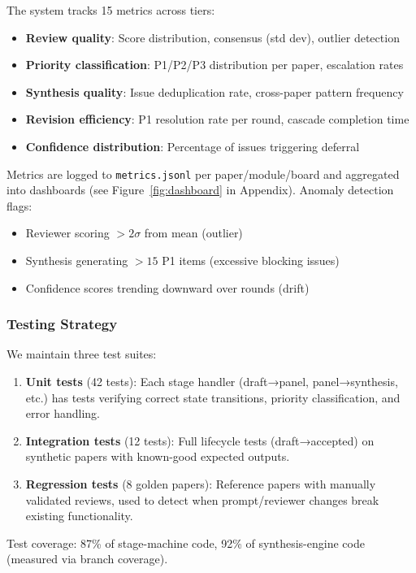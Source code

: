 The system tracks 15 metrics across tiers:
\begin{itemize}
\item \textbf{Review quality}: Score distribution, consensus (std dev), outlier detection
\item \textbf{Priority classification}: P1/P2/P3 distribution per paper, escalation rates
\item \textbf{Synthesis quality}: Issue deduplication rate, cross-paper pattern frequency
\item \textbf{Revision efficiency}: P1 resolution rate per round, cascade completion time
\item \textbf{Confidence distribution}: Percentage of issues triggering deferral
\end{itemize}

Metrics are logged to \texttt{metrics.jsonl} per paper/module/board and aggregated into dashboards (see Figure~\ref{fig:dashboard} in Appendix). Anomaly detection flags:
\begin{itemize}
\item Reviewer scoring $> 2\sigma$ from mean (outlier)
\item Synthesis generating $> 15$ P1 items (excessive blocking issues)
\item Confidence scores trending downward over rounds (drift)
\end{itemize}

\subsubsection{Testing Strategy}

We maintain three test suites:
\begin{enumerate}
\item \textbf{Unit tests} (42 tests): Each stage handler (draft→panel, panel→synthesis, etc.) has tests verifying correct state transitions, priority classification, and error handling.
\item \textbf{Integration tests} (12 tests): Full lifecycle tests (draft→accepted) on synthetic papers with known-good expected outputs.
\item \textbf{Regression tests} (8 golden papers): Reference papers with manually validated reviews, used to detect when prompt/reviewer changes break existing functionality.
\end{enumerate}

Test coverage: 87\% of stage-machine code, 92\% of synthesis-engine code (measured via branch coverage).

